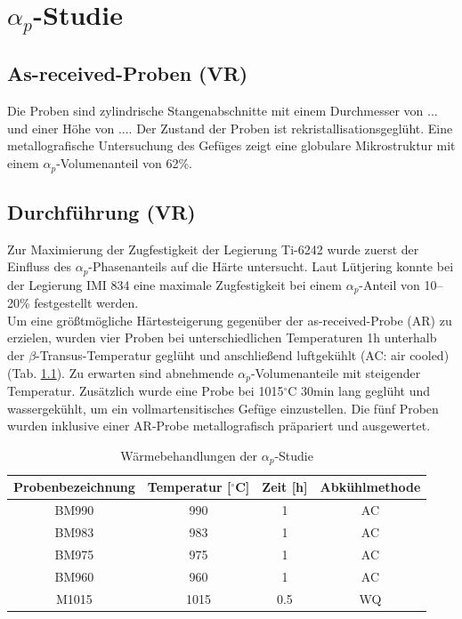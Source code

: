 \chapter{$\alpha_p$-Studie}

\section{As-received-Proben (VR)}

Die Proben sind zylindrische Stangenabschnitte mit einem Durchmesser von {...} und einer Höhe von {...}. Der Zustand der Proben ist rekristallisationsgeglüht. Eine metallografische Untersuchung des Gefüges zeigt eine globulare Mikrostruktur mit einem $\alpha_p$-Volumenanteil von 62\%. 


\section{Durchführung (VR)}

Zur Maximierung der Zugfestigkeit der Legierung Ti-6242 wurde zuerst der Einfluss des $\alpha_p$-Phasenanteils auf die Härte untersucht. Laut Lütjering \cite{Lutjering.2007} konnte bei der Legierung IMI 834 eine maximale Zugfestigkeit bei einem $\alpha_p$-Anteil von 10--20\% festgestellt werden. \\
Um eine größtmögliche Härtesteigerung gegenüber der as-received-Probe (AR) zu erzielen, wurden vier Proben bei unterschiedlichen Temperaturen 1h unterhalb der $\beta$-Transus-Temperatur geglüht und anschließend luftgekühlt (AC: air cooled) (Tab. \ref{tab:alphap}). Zu erwarten sind abnehmende $\alpha_p$-Volumenanteile mit steigender Temperatur. Zusätzlich wurde eine Probe bei 1015$^\circ$C 30min lang geglüht und wassergekühlt, um ein vollmartensitisches Gefüge einzustellen. Die fünf Proben wurden inklusive einer AR-Probe metallografisch präpariert und ausgewertet.



\begin{table}[h]
	\centering
	\begin{tabular}{|c|c|c|c|}
		\hline 
		Probenbezeichnung & Temperatur [$^\circ$C] & Zeit [h] & Abkühlmethode \\ 
		\hline 
		BM990 & 990 & 1 & AC\\ 
		\hline 
		BM983 & 983 & 1 & AC\\
		\hline
		BM975 & 975 & 1 & AC\\ 
		\hline
		BM960 & 960 & 1 & AC\\ 
		\hline 
		M1015 & 1015 & 0.5 & WQ\\ 
		\hline
	\end{tabular} 
	\caption{Wärmebehandlungen der $\alpha_p$-Studie}
	\label{tab:alphap}
\end{table}



